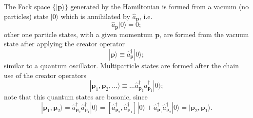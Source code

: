 The Fock space $\{|\mathbf{p}\rangle\}$ generated by the Hamiltonian is formed from a vacuum (no particles) state $|0\rangle$ which is annihilated by $\hat{a}_\mathbf{p}$, i.e.
\begin{equation}
	\hat{a}_\mathbf{p}|0\rangle=0;
\end{equation}
other one particle states, with a given momentum $\mathbf{p}$, are formed from the vacuum state after applying the creator operator
\begin{equation}
	|\mathbf{p}\rangle\equiv \hat{a}^\dagger_{\mathbf{p}}|0\rangle;
\end{equation}
similar to a quantum oscillator. Multiparticle states are formed after the chain use of the creator operators
\begin{equation}
	|\mathbf{p}_1,\mathbf{p}_2,\hdots\rangle\equiv \hdots \hat{a}^\dagger_{\mathbf{p}_2}\hat{a}^\dagger_{\mathbf{p}_1}|0\rangle;
\end{equation}
note that this quantum states are bosonic, since
\begin{equation}
	|\mathbf{p}_1,\mathbf{p}_2\rangle=\hat{a}^\dagger_{\mathbf{p}_2}\hat{a}^\dagger_{\mathbf{p}_1}|0\rangle=\left[\hat{a}^\dagger_{\mathbf{p}_2},\hat{a}^\dagger_{\mathbf{p}_1}\right]|0\rangle+\hat{a}^\dagger_{\mathbf{p}_1}\hat{a}^\dagger_{\mathbf{p}_2}|0\rangle=|\mathbf{p}_2,\mathbf{p}_1\rangle.
\end{equation}